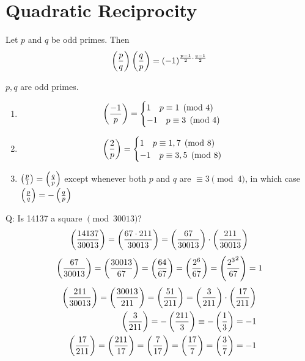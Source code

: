 \section{Quadratic Reciprocity}
    \begin{theorem} 
        Let $p$ and $q$ be odd primes. Then
        \[
            \left( \frac{p}{q} \right) \left( \frac{q}{p} \right)  = (-1)^{\frac{p-1}{2}\cdot\frac{q-1}{2}}
        \]
    \end{theorem}
    \begin{theorem} 
        $p,q$ are odd primes.
        \begin{enumerate}
            \item 
                \begin{align*}
                    \left( \frac{-1}{p} \right)  = 
                    \begin{cases}
                        1 \quad p\equiv 1\pmod{4} \\
                        -1 \quad p\equiv 3\pmod{4}
                    \end{cases}
                \end{align*}
            \item 
                \begin{align*}
                    \left( \frac{2}{p} \right)  = 
                    \begin{cases}
                        1 \quad p\equiv 1,7\pmod{8} \\
                        -1 \quad p\equiv 3,5\pmod{8}
                    \end{cases}
                \end{align*}
            \item $\left( \frac{p}{1} \right) =\left( \frac{q}{p} \right) $ except whenever both
            $p$ and $q$ are $\equiv 3\pmod{4}$, in which case 
            $\left( \frac{p}{q} \right)  = -\left( \frac{q}{p} \right) $
        \end{enumerate}
    \end{theorem}
    Q: Is 14137 a square $\pmod{30013}$?
    \[
        \left( \frac{14137}{30013} \right)  = \left( \frac{67\cdot 211}{30013} \right) 
        = \left( \frac{67}{30013} \right) \cdot\left( \frac{211}{30013} \right) 
    \]
    \begin{align*}
        \left( \frac{67}{30013} \right)  = \left( \frac{30013}{67} \right)  = \left( \frac{64}{67} \right) 
        = \left( \frac{2^6}{67} \right)  = \left( \frac{{2^3}^2}{67} \right)  = 1
    \end{align*}
    \begin{align*}
        \left( \frac{211}{30013} \right)  = \left( \frac{30013}{211} \right)  = \left( \frac{51}{211} \right) 
        = \left( \frac{3}{211} \right) \cdot\left( \frac{17}{211} \right)  \\
        \left( \frac{3}{211} \right)  = -\left( \frac{211}{3} \right)  \equiv -\left( \frac{1}{3} \right)  = -1 \\
        \left( \frac{17}{211} \right)  = \left( \frac{211}{17} \right)  = \left( \frac{7}{17} \right)  = \left( \frac{17}{7} \right)  = \left( \frac{3}{7} \right)  = -1
    \end{align*}